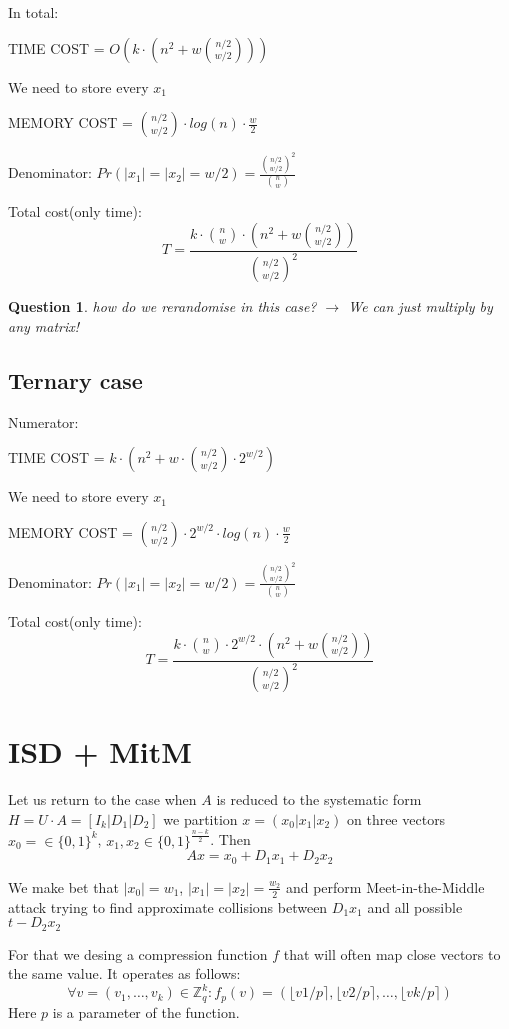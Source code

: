 \documentclass[12pt]{article}
\newcommand{\ZZ}{\mathbb{Z}}
\newtheorem{question}{Question}
\begin{document}
In total:

TIME COST = $O(k \cdot (n^2 + w\binom{n/2}{w/2}))$

We need to store every $x_1$


MEMORY COST = $\binom{n/2}{w/2} \cdot log(n) \cdot \frac{w}{2}$

Denominator:
$Pr(|x_1| = |x_2| = w/2) = \frac{\binom{n/2}{w/2}^{2}}{\binom{n}{w}}$

Total cost(only time):
\[
  T = \frac{k \cdot \binom{n}{w} \cdot (n^2 + w\binom{n/2}{w/2})}{\binom{n/2}{w/2}^2}
\]

\begin{question}
  how do we rerandomise in this case? $\rightarrow$ We can just multiply by any matrix!
\end{question}

\subsection{Ternary case}
Numerator:

TIME COST = $k \cdot (n^2 + w \cdot \binom{n/2}{w/2} \cdot 2^{w/2})$

We need to store every $x_1$

MEMORY COST = $\binom{n/2}{w/2} \cdot 2^{w/2} \cdot log(n) \cdot \frac{w}{2}$

Denominator:
$Pr(|x_1| = |x_2| = w/2) = \frac{\binom{n/2}{w/2}^{2}}{\binom{n}{w}}$

Total cost(only time):
\[
  T = \frac{k \cdot \binom{n}{w} \cdot 2^{w/2} \cdot (n^2 + w\binom{n/2}{w/2})}{\binom{n/2}{w/2}^2}
\]
\section{ISD + MitM}
Let us return to the case when $A$ is reduced to the systematic form $H = U \cdot A = [I_{k}| D_1 | D_2]$ we partition $x = (x_0 |x_1 |x_2)$ on three vectors $x_0 = \in \{0,1\}^{k}$, $x_1,x_2 \in \{0,1\}^{\frac{n-k}{2}}$. Then
\[
  Ax = x_0 + D_1x_1 + D_2x_2
\]

We make bet that $|x_0| = w_1$, $|x_1| = |x_2| = \frac{w_2}{2}$ and perform Meet-in-the-Middle attack trying to find approximate collisions between $D_1x_1$ and all possible $t - D_2x_2$

For that we desing a compression function $f$ that will often map close vectors to the same value. It operates as follows:
\[
\forall v = (v_1, \dots , v_k)\in \ZZ_{q}^{k}: f_{p}(v) = (\lfloor v1/p \rceil, \lfloor v2/p \rceil, \dots, \lfloor vk/p \rceil)
\]
Here $p$ is a parameter of the function.
\end{document}
